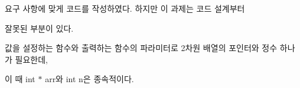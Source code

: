 
\begin{DoxyRefList}
\item[\label{bug__bug000001}%
\hypertarget{bug__bug000001}{}%
File \hyperlink{hw01_8c}{hw01.c} ]요구 사항에 맞게 코드를 작성하였다. 하지만 이 과제는 코드 설계부터 \par
잘못된 부분이 있다.\par
\par
값을 설정하는 함수와 출력하는 함수의 파라미터로 2차원 배열의 포인터와 정수 하나가 필요한데,\par
이 때 int $\ast$ arr와 int n은 종속적이다.\par
 
\end{DoxyRefList}